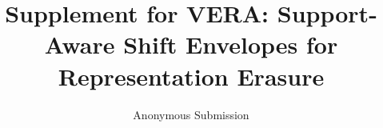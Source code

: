 \documentclass[letterpaper]{article}
\title{Supplement for VERA: Support-Aware Shift Envelopes for Representation Erasure}
\author{Anonymous Submission}
\begin{document}
\maketitle

\nocite{*}

\end{document}
